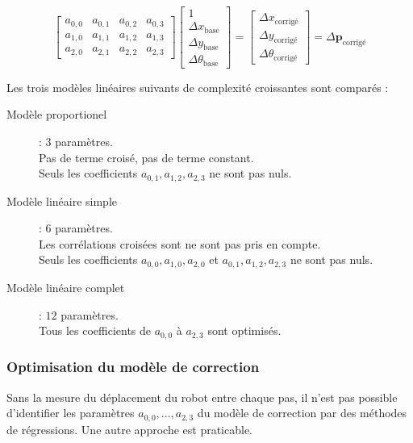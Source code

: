 $$
\begin{bmatrix}
    a_{0,0} & a_{0,1} & a_{0,2} & a_{0,3} \\
    a_{1,0} & a_{1,1} & a_{1,2} & a_{1,3} \\
    a_{2,0} & a_{2,1} & a_{2,2} & a_{2,3}
\end{bmatrix}
\begin{bmatrix}
    1 \\
    \Delta x_{\text{base}} \\   
    \Delta y_{\text{base}} \\   
    \Delta \theta_{\text{base}}
\end{bmatrix}
=
\begin{bmatrix}
    \Delta x_{\text{corrigé}} \\   
    \Delta y_{\text{corrigé}} \\   
    \Delta \theta_{\text{corrigé}}
\end{bmatrix}
=
\Delta \bm{p}_{\text{corrigé}}
$$

Les trois modèles linéaires suivants de complexité croissantes sont comparés :
\begin{description}
    \item[Modèle proportionel] : $3$ paramètres.\\ 
        Pas de terme croisé, pas de terme constant.\\
        Seuls les coefficients $a_{0,1},a_{1,2},a_{2,3}$ ne sont pas nuls.
    \item[Modèle linéaire simple] : $6$ paramètres.\\ 
        Les corrélations croisées sont ne sont pas pris en compte.\\
        Seuls les coefficients $a_{0,0},a_{1,0},a_{2,0}$ et $a_{0,1},a_{1,2},a_{2,3}$ ne sont pas nuls.
    \item[Modèle linéaire complet] : $12$ paramètres.\\
        Tous les coefficients de $a_{0,0}$ à $a_{2,3}$ sont optimisés.
\end{description}

\subsubsection{Optimisation du modèle de correction}

Sans la mesure du déplacement du robot entre chaque pas, il n'est pas
possible d'identifier les paramètres $a_{0,0},...,a_{2,3}$ du modèle de correction
par des méthodes de régressions. Une autre approche est praticable.

